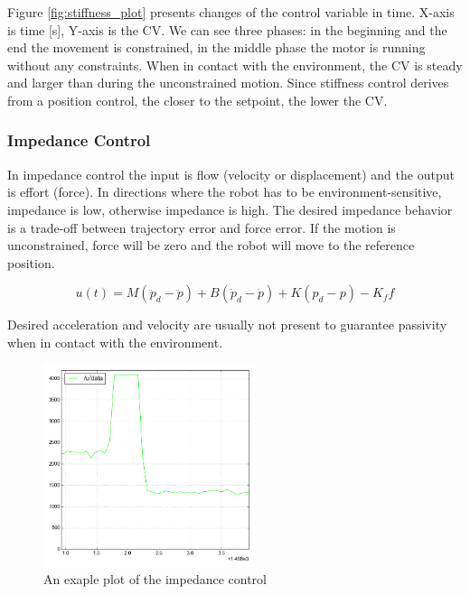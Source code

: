Figure \ref{fig:stiffness_plot} presents changes of the control variable in time. X-axis is time [s], Y-axis is the CV. We can see three phases: in the beginning and the end the movement is constrained, in the middle phase the motor is running without any constraints.
When in contact with the environment, the CV is steady and larger than during the unconstrained motion.
Since stiffness control derives from a position control, the closer to the setpoint, the lower the CV. 

\subsubsection{Impedance Control}
In impedance control the input is flow (velocity or displacement) and the output is effort (force).
In directions where the robot has to be environment-sensitive, impedance is low, otherwise impedance is high. The desired impedance behavior is a trade-off between trajectory error and force error. If the motion is unconstrained, force will be zero and the robot will move to the reference position. 

\begin{equation}
u(t) = M(\ddot{p}_d - \ddot{p}) + B(\dot{p}_d-\dot{p}) + K(p_d-p) - K_f f
\end{equation}

Desired acceleration and velocity are usually not present to guarantee passivity when in contact with the environment.

\begin{figure}%
 \begin{center} 
  \includegraphics[width=0.55\textwidth]{./stuff/impedance_plot}
 \end{center}
 \caption{An exaple plot of the impedance control}
 \label{fig:impedance_plot} 
\end{figure} 

